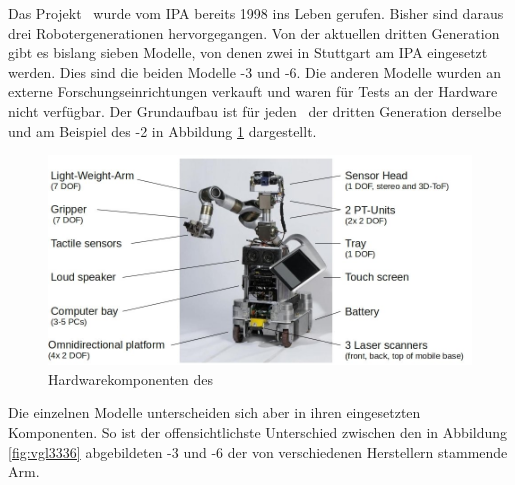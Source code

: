 Das Projekt \cob\ wurde vom \ac{IPA} bereits 1998 ins Leben gerufen. Bisher sind
daraus drei Robotergenerationen hervorgegangen. Von der aktuellen dritten
Generation gibt es bislang sieben Modelle, von denen zwei in Stuttgart am \ac{IPA}
eingesetzt werden. Dies sind die beiden Modelle -3 und -6. Die anderen
Modelle wurden an externe Forschungseinrichtungen verkauft und waren für Tests
an der Hardware nicht verfügbar. Der Grundaufbau ist für jeden \cob\ der dritten
Generation derselbe und am Beispiel des -2 in Abbildung \ref{setup} dargestellt.

\begin{figure}[Hht]
\centering
\includegraphics[width=\textwidth]{images/hw_setup_with_text}
\caption{Hardwarekomponenten des \cob}
\label{setup}
\end{figure}

  Die einzelnen Modelle unterscheiden sich aber in ihren
eingesetzten Komponenten. So ist der offensichtlichste Unterschied zwischen
den in Abbildung \ref{fig:vgl3336} abgebildeten -3 und -6 der von verschiedenen Herstellern stammende Arm. 

